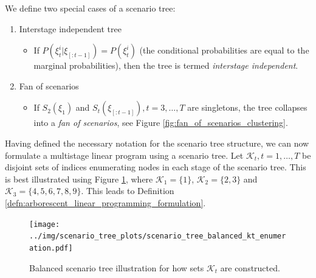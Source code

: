 We define two special cases of a scenario tree:
\begin{enumerate}
\item Interstage independent tree
	\begin{itemize}
		\item If $P(\xi_t^i|\xi_{[:t-1]})=P(\xi_t^i)$ (the conditional probabilities are equal to the marginal probabilities), then the tree is termed \textit{interstage independent}.
	\end{itemize}
\item Fan of scenarios
	\begin{itemize}
		\item If $S_2(\xi_1)$ and $S_t(\xi_{[:t-1]}), t=3,\dots,T$ are singletons, the tree collapses into a 		\textit{fan of scenarios}, see Figure \ref{fig:fan_of_scenarios_clustering}.
	\end{itemize}
\end{enumerate}
Having defined the necessary notation for the scenario tree structure, we can now formulate a multistage linear program using a scenario tree. Let $\mathcal{K}_t, t=1,\dots,T$ be disjoint sets of indices enumerating nodes in each stage of the scenario tree.
This is best illustrated using Figure \ref{fig:balanced_scenario_tree_illustration_sets_kt}, where $\mathcal{K}_1=\{1\}$, $\mathcal{K}_2=\{2,3\}$ and $\mathcal{K}_3=\{4,5,6,7,8,9\}$. This leads to Definition \ref{defn:arborescent_linear_programming_formulation}.

\begin{figure}
  \texttt{[image: ../img/scenario\_tree\_plots/scenario\_tree\_balanced\_kt\_enumeration.pdf]}
  \caption{Balanced scenario tree illustration for how sets $\mathcal{K}_t$ are constructed.}
  \label{fig:balanced_scenario_tree_illustration_sets_kt}
\end{figure}

